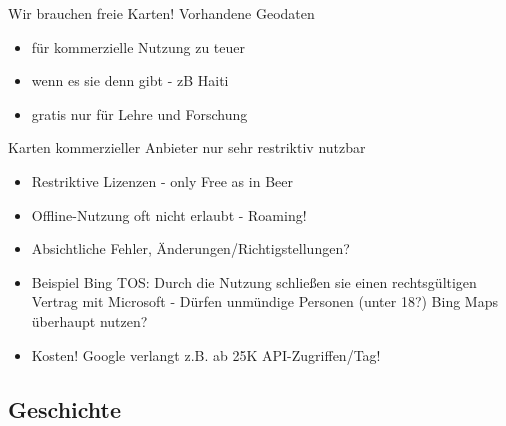\documentclass{beamer}
\begin{document}
\begin{frame}{Wir brauchen freie Karten!}
Vorhandene Geodaten 
\begin{itemize}
  \item	für kommerzielle Nutzung zu teuer
  \item	wenn es sie denn gibt - zB Haiti
  \item	gratis nur für Lehre und Forschung
\end{itemize}

\pause
\vspace{2mm}
Karten kommerzieller Anbieter nur sehr restriktiv nutzbar
\begin{itemize}
  \item Restriktive Lizenzen - only Free as in Beer
  \item Offline-Nutzung oft nicht erlaubt - Roaming!
  \item Absichtliche Fehler, Änderungen/Richtigstellungen?
  \pause
  \item Beispiel Bing TOS: Durch die Nutzung schließen sie einen rechtsgültigen Vertrag mit Microsoft - Dürfen unmündige Personen (unter 18?) Bing Maps überhaupt nutzen?
  \item Kosten! Google verlangt z.B. ab 25K API-Zugriffen/Tag!
\end{itemize}

\end{frame}


\subsection{Geschichte}
\end{document}
